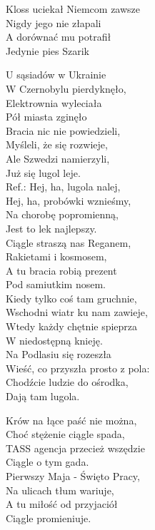 \begin{multicols}{2}
Kloss uciekał Niemcom zawsze \\
Nigdy jego nie złapali \\
A dorównać mu potrafił \\
Jedynie pies Szarik \\
\newcolumn

U sąsiadów w Ukrainie \\
W Czernobylu pierdyknęło, \\
Elektrownia wyleciała \\
Pół miasta zginęło \\

Bracia nic nie powiedzieli, \\
Myśleli, że się rozwieje, \\
Ale Szwedzi namierzyli, \\
Już się lugol leje. \\

Ref.: Hej, ha, lugola nalej, \\
Hej, ha, probówki wznieśmy, \\
Na chorobę popromienną, \\
Jest to lek najlepszy. \\

Ciągle straszą nas Reganem, \\
Rakietami i kosmosem, \\
A tu bracia robią prezent \\
Pod samiutkim nosem. \\

Kiedy tylko coś tam gruchnie, \\
Wschodni wiatr ku nam zawieje, \\
Wtedy każdy chętnie spieprza \\
W niedostępną knieję. \\

Na Podlasiu się rozeszła \\
Wieść, co przyszła prosto z pola:\\
Chodźcie ludzie do ośrodka, \\
Dają tam lugola. \\
\newcolumn

Krów na łące paść nie można, \\
Choć stężenie ciągle spada, \\
TASS agencja przecież wszędzie \\
Ciągle o tym gada. \\

Pierwszy Maja - Święto Pracy, \\
Na ulicach tłum wariuje, \\
A tu miłość od przyjaciół\\
Ciągle promieniuje.\\


\end{multicols}
